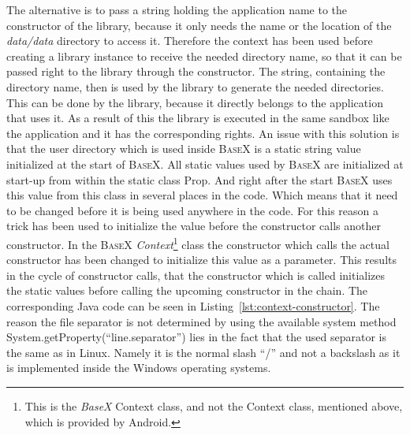 The alternative is to pass a string holding the application name to the constructor of the library, because it only needs the name or the location of the \textit{data/data} directory to access it.
Therefore the context has been used before creating a library instance to receive the needed directory name, so that it can be passed right to the library through the constructor.
The string, containing the directory name, then is used by the library to generate the needed directories.
This can be done by the library, because it directly belongs to the application that uses it.
As a result of this the library is executed in the same sandbox like the application and it has the corresponding rights.
An issue with this solution is that the user directory which is used inside \textsc{BaseX} is a static string value initialized at the start of \textsc{BaseX}.
All static values used by \textsc{BaseX} are initialized at start-up from within the static class \textsf{Prop}.
And right after the start \textsc{BaseX} uses this value from this class in several places in the code.
Which means that it need to be changed before it is being used anywhere in the code.
For this reason a trick has been used to initialize the value before the constructor calls another constructor.
In the \textsc{BaseX} \textit{Context}\footnote{This is the \textit{BaseX} Context class, and not the Context class, mentioned above, which is provided by Android.} class the constructor which calls the actual constructor has been changed to initialize this value as a parameter.
This results in the cycle of constructor calls, that the constructor which is called initializes the static values before calling the upcoming constructor in the chain.
The corresponding Java code can be seen in Listing~\ref{lst:context-constructor}.
The reason the file separator is not determined by using the available system method \textsf{System.getProperty(``line.separator'')} lies in the fact that the used separator is the same as in Linux.
Namely it is the normal slash ``/'' and not a backslash as it is implemented inside the Windows operating systems.



